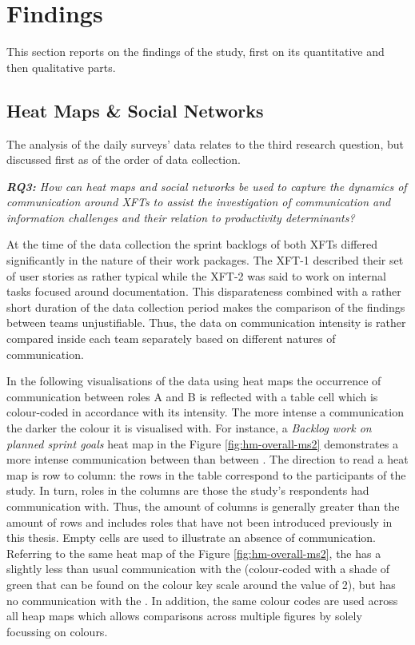 \chapter{Findings}
\label{chap:findings}
This section reports on the findings of the study, first on its quantitative and then qualitative parts.

\section{Heat Maps \& Social Networks}
\label{sec:findings-daily-surveys}
The analysis of the daily surveys' data relates to the third research question, but discussed first as of the order of data collection.

\textit{\textbf{RQ3:} How can heat maps and social networks be used to capture the dynamics of communication around \acp{XFT} to assist the investigation of communication and information challenges and their relation to productivity determinants?}

At the time of the data collection the sprint backlogs of both \acp{XFT} differed significantly in the nature of their work packages. The \ac{XFT}-1 described their set of user stories as rather typical while the \ac{XFT}-2 was said to work on internal tasks focused around documentation. This disparateness combined with a rather short duration of the data collection period makes the comparison of the findings between teams unjustifiable. Thus, the data on communication intensity is rather compared inside each team separately based on different natures of communication.

In the following visualisations of the data using heat maps the occurrence of communication between roles A and B is reflected with a table cell which is colour-coded in accordance with its intensity. The more intense a communication the darker the colour it is visualised with. For instance, a \emph{Backlog work on planned sprint goals} heat map in the Figure \ref{fig:hm-overall-ms2} demonstrates a more intense communication between  than between . The direction to read a heat map is row to column: the rows in the table correspond to the participants of the study. In turn, roles in the columns are those the study's respondents had communication with. Thus, the amount of columns is generally greater than the amount of rows and includes roles that have not been introduced previously in this thesis. Empty cells are used to illustrate an absence of communication. Referring to the same heat map of the Figure \ref{fig:hm-overall-ms2}, the  has a slightly less than usual communication with the  (colour-coded with a shade of green that can be found on the colour key scale around the value of 2), but has no communication with the . In addition, the same colour codes are used across all heap maps which allows comparisons across multiple figures by solely focussing on colours.

